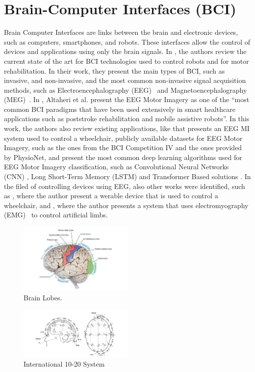 \section{Brain-Computer Interfaces (BCI)}
Brain Computer Interfaces are links between the brain and electronic devices, such as computers, smartphones, and robots.
These interfaces allow the control of devices and applications using only the brain signals.
In \cite{robinson2021emerging}, the authors review the current state of the art for BCI technologies used to control robots and for motor rehabilitation.
In their work, they present the main types of BCI, such as invasive, and non-invasive, and the most common non-invasive signal acquisition methods, such as Electroencephalography (EEG)~\cite{niedermeyer2005electroencephalography} and Magnetoencephalography (MEG)~\cite{singh2014magnetoencephalography}.
In \cite{altaheri_deep_2023}, Altaheri et al. present the EEG Motor Imagery as one of the ``most common BCI paradigms that have been used extensively in smart healthcare applications such as poststroke rehabilitation and mobile assistive robots''.
In this work, the authors also review existing applications, like \cite{tang2020motor} that presents an EEG MI system used to control a wheelchair, publicly available datasets for EEG Motor Imagery, such as the ones from the BCI Competition IV and the ones provided by PhysioNet\cite{goldberger2000physiobank, schalk2004bci2000}, and present the most common deep learning algorithms used for EEG Motor Imagery classification, such as Convolutional Neural Networks (CNN) \cite{lawhern2018eegnet}, Long Short-Term Memory (LSTM) and Transformer Based solutions \cite{sharma_deep_2023}.
In the filed of controlling devices using EEG, also other works were identified, such as \cite{10471624}, where the author present a werable device that is used to control a wheelchair, and \cite{10453986}, where the author presents a system that uses electromyography (EMG)~\cite{mills2005basics} to control artificial limbs.
\begin{figure}[htbp!]
    \centering
    \includegraphics[width=0.5\textwidth]{Figures/Related/brain_lobes}
    \caption{Brain Lobes. \cite{Harrison2015}}
\end{figure}
\begin{figure}[htbp!]
    \centering
    \includegraphics[width=0.5\textwidth]{Figures/Related/international_10_20_system}
    \caption{International 10-20 System \cite{luis2012brain}}
\end{figure}

